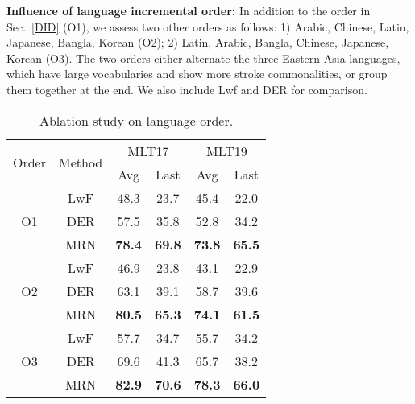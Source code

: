 \documentclass[10pt,twocolumn,letterpaper]{article}
\begin{document}
\noindent\textbf{Influence of language incremental order:} In addition to the order in Sec.~\ref{DID} (O1), we assess two other orders as follows: 1) Arabic, Chinese, Latin, Japanese, Bangla, Korean (O2); 2) Latin, Arabic, Bangla, Chinese, Japanese, Korean (O3). The two orders either alternate the three Eastern Asia languages, which have large vocabularies and show more stroke commonalities, or group them together at the end. We also include Lwf and DER for comparison.
\begin{table}[]
\begin{center}
\begin{tabular}{c|c|cc|cc}
\hline
\multirow{2}{*}{Order} & \multirow{2}{*}{Method} & \multicolumn{2}{c|}{MLT17} & \multicolumn{2}{c}{MLT19} \\ \cline{3-6} 
                       &                         & Avg          & Last        & Avg         & Last        \\ \hline
\multirow{3}{*}{O1}    & LwF\cite{Li2017LWF}                     & 48.3         & 23.7        & 45.4        & 22.0        \\
                       & DER\cite{Yan2021DER}                     & 57.5         & 35.8        & 52.8        & 34.2        \\
                       & MRN                    &\textbf{78.4} & \textbf{69.8} & \textbf{73.8} & \textbf{65.5}  \\ \hline

\multirow{3}{*}{O2}    & LwF\cite{Li2017LWF}                     & 46.9         & 23.8        & 43.1        & 22.9        \\
                       & DER\cite{Yan2021DER}                     & 63.1         & 39.1        & 58.7        & 39.6        \\
                       & MRN                    & \textbf{80.5} & \textbf{65.3} & \textbf{74.1} & \textbf{61.5}  \\ \hline
\multirow{3}{*}{O3}    & LwF\cite{Li2017LWF}                     & 57.7         & 34.7        & 55.7        & 34.2        \\
                       & DER\cite{Yan2021DER}                     & 69.6         & 41.3        & 65.7        & 38.2        \\
                       & MRN                     & \textbf{82.9} & \textbf{70.6} & \textbf{78.3} & \textbf{66.0}\\ \hline                
\end{tabular}
\end{center}
\caption{Ablation study on language order.}
\label{table:order}
\end{table}
\end{document}
